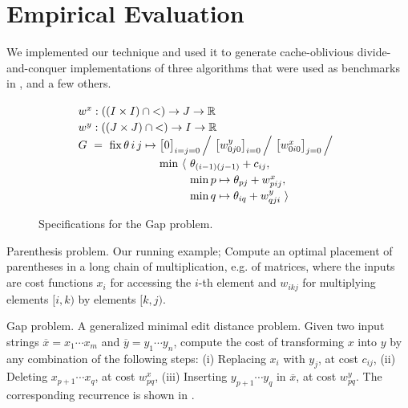 \section{Empirical Evaluation}
\label{evaluation}

We implemented our technique and used it to generate ca\-che-oblivious
divide-and-conquer implementations of three algorithms that were used as
benchmarks in \cite{IPDPS15/Tithi}, and a few others.

\begin{figure}[b!]
\vspace{-5mm}
\[
  \renewcommand\arraystretch{1.2}
  \begin{array}{@{}l@{}l@{}l@{}}
    \lspan3{w^x : ((I\times I)\cap{<})\to J\to\R} \\
    \lspan3{w^y : ((J\times J)\cap{<})\to I\to\R} \\
    G ~=~ \fix \theta\,i\,j\mapsto{}
      & \lspan2{\big[0\big]_{i=j=0} \,\Big/~ \big[w^y_{0j0}\big]_{i=0} \,\Big/~ \big[w^x_{0i0}\big]_{j=0} \,\Big/} \\
      & \min~\langle~ & \theta_{(i-1)(j-1)}+c_{ij}, \\
      & & \min p\mapsto\theta_{pj}+w^x_{pij}, \\
      & & \min q\mapsto\theta_{iq}+w^y_{qji} ~\rangle
  \end{array}
\]
\vspace{-3mm}
\caption{\label{evaluation:gap spec}
  Specifications for the Gap problem.}
\end{figure}

\begin{paragraph}{Parenthesis problem.} Our running example; Compute
an optimal placement of parentheses in a long chain of multiplication, e.g. of matrices, where the inputs
are cost functions $x_i$ for accessing the $i$-th element and
$w_{ikj}$ for multiplying elements $[i,k)$ by elements $[k,j)$.
\end{paragraph}

\begin{paragraph}{Gap problem.}
A generalized minimal edit distance problem. Given two input strings 
$\overline{x}=x_1\cdots x_m$ and $\overline{y}=y_1\cdots y_n$,
compute the cost of transforming $x$ into $y$ by any combination of the
following steps:
  (i) Replacing $x_i$ with $y_j$, at cost $c_{ij}$,
  (ii) Deleting $x_{p+1}\cdots x_q$, at cost $w^x_{pq}$,
  (iii) Inserting $y_{p+1}\cdots y_q$ in $\overline{x}$, at cost $w^y_{pq}$.
The corresponding recurrence is shown in .
\end{paragraph}

